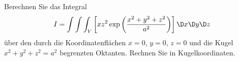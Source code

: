 \begin{atiTask}[
  title = Volumenberechnung II
]
Berechnen Sie das Integral
\[
I=\int \int \int_V\left[xz^2\exp{\left(\frac{x^2+y^2+z^2}{a^2}\right)}\right] \D x\D y\D z
\]
über den durch die Koordinatenflächen $x=0$, $y=0$, $z=0$ und die Kugel $x^2+y^2+z^2=a^2$ begrenzten Oktanten. Rechnen Sie in Kugelkoordinaten.

\end{atiTask}
